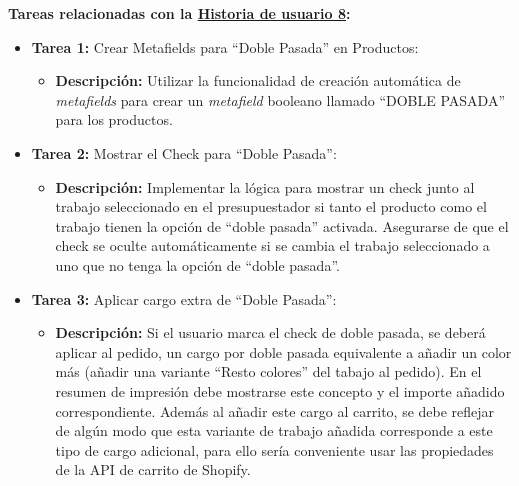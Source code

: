 \documentclass[11pt]{article}
\begin{document}
\textbf{Tareas relacionadas con la \hyperref[sec:historia8]{Historia de usuario 8}:}
\begin{itemize}
    \item \textbf{Tarea 1:} Crear Metafields para ``Doble Pasada'' en Productos:
          \begin{itemize}[label=--]
              \item \textbf{Descripción:} Utilizar la funcionalidad de creación automática de \textit{metafields} para crear un \textit{metafield} booleano llamado ``DOBLE PASADA'' para los productos.
          \end{itemize}
    \item \textbf{Tarea 2:} Mostrar el Check para ``Doble Pasada'':
          \begin{itemize}[label=--]
              \item \textbf{Descripción:} Implementar la lógica para mostrar un check junto al trabajo seleccionado en el presupuestador si tanto el producto como el trabajo tienen la opción de ``doble pasada'' activada. Asegurarse de que el check se oculte automáticamente si se cambia el trabajo seleccionado a uno que no tenga la opción de ``doble pasada''.
          \end{itemize}
    \item \textbf{Tarea 3:} Aplicar cargo extra de ``Doble Pasada'':
          \begin{itemize}[label=--]
              \item \textbf{Descripción:} Si el usuario marca el check de doble pasada, se deberá aplicar al pedido, un cargo por doble pasada equivalente a añadir un color más (añadir una variante ``Resto colores'' del tabajo al pedido). En el resumen de impresión debe mostrarse este concepto y el importe añadido correspondiente. Además al añadir este cargo al carrito, se debe reflejar de algún modo que esta variante de trabajo añadida corresponde a este tipo de cargo adicional, para ello sería conveniente usar las propiedades de la API de carrito de Shopify.
          \end{itemize}
\end{itemize}
\end{document}
